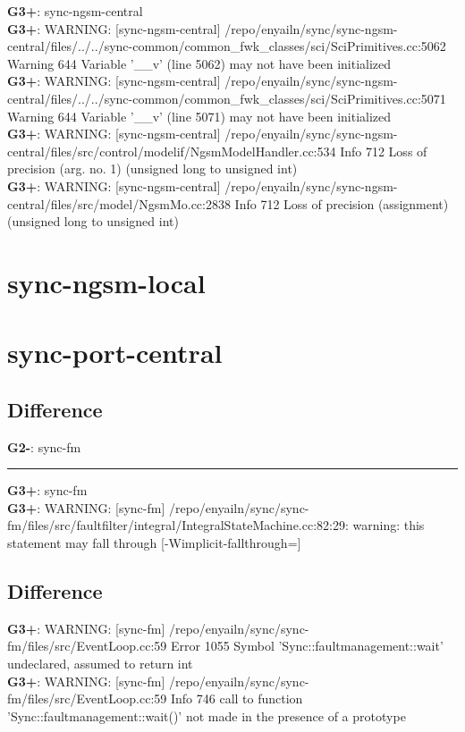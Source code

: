 \documentclass[12pt,twoside]{article}
\begin{document}
\textbf{G3+}: sync-ngsm-central\\ 
\textbf{G3+}: WARNING: [sync-ngsm-central] /repo/enyailn/sync/sync-ngsm-central/files/../../sync-common/common\_fwk\_classes/sci/SciPrimitives.cc:5062 Warning 644 Variable '\_\_v' (line 5062) may not have been initialized\\ 
\textbf{G3+}: WARNING: [sync-ngsm-central] /repo/enyailn/sync/sync-ngsm-central/files/../../sync-common/common\_fwk\_classes/sci/SciPrimitives.cc:5071 Warning 644 Variable '\_\_v' (line 5071) may not have been initialized\\ 
\textbf{G3+}: WARNING: [sync-ngsm-central] /repo/enyailn/sync/sync-ngsm-central/files/src/control/modelif/NgsmModelHandler.cc:534 Info 712 Loss of precision (arg. no. 1) (unsigned long to unsigned int)\\ 
\textbf{G3+}: WARNING: [sync-ngsm-central] /repo/enyailn/sync/sync-ngsm-central/files/src/model/NgsmMo.cc:2838 Info 712 Loss of precision (assignment) (unsigned long to unsigned int)\\ 
  
\section{sync-ngsm-local} 
  
\section{sync-port-central} 
\subsection{Difference} 
\textbf{G2-}: sync-fm 
\rule{\textwidth}{0.5pt} 
\textbf{G3+}: sync-fm\\ 
\textbf{G3+}: WARNING: [sync-fm] /repo/enyailn/sync/sync-fm/files/src/faultfilter/integral/IntegralStateMachine.cc:82:29: warning: this statement may fall through [-Wimplicit-fallthrough=]\\ 
\subsection{Difference} 
\textbf{G3+}: WARNING: [sync-fm] /repo/enyailn/sync/sync-fm/files/src/EventLoop.cc:59 Error 1055 Symbol 'Sync::faultmanagement::wait' undeclared, assumed to return int\\ 
\textbf{G3+}: WARNING: [sync-fm] /repo/enyailn/sync/sync-fm/files/src/EventLoop.cc:59 Info 746 call to function 'Sync::faultmanagement::wait()' not made in the presence of a prototype\\ 
\end{document}
